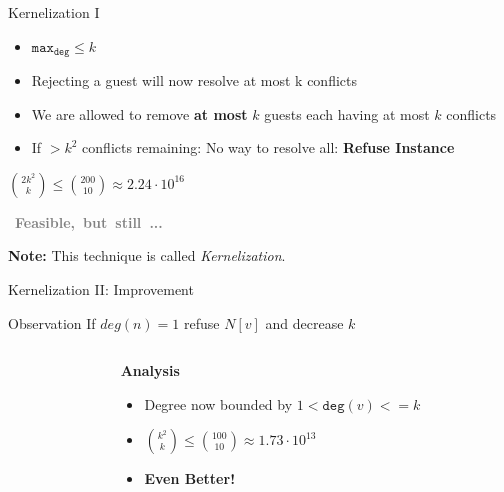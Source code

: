 \begin{frame}[c]{Kernelization I}
\begin{itemize}
    \item $\mathtt{max}_{\mathtt{deg}} \leq k$
    \item Rejecting a guest will now resolve at most k conflicts
    \item We are allowed to remove \textbf{at most} $k$ guests each having at most $k$ conflicts
    \item If $ > k^2$ conflicts remaining: No way to resolve all: \textbf{Refuse Instance}
\end{itemize}
\begin{center}

$\binom{2k^2}{k} \leq \binom{200}{10} \approx 2.24\cdot 10^{16}$


\hbox{
\textcolor{gray}{\textbf{Feasible, but still ...}}
}
\end{center}
   \pause\textbf{Note: }This technique is called \textit{Kernelization}. 
\end{frame}

\begin{frame}[c]{Kernelization II: Improvement}

    \begin{exampleblock}{Observation}
    If $deg(n) = 1$ refuse $N[v]$ and decrease $k$ 
    \end{exampleblock}
    
\begin{columns}[T] %
    \begin{column}{.48\textwidth}
 \begin{center}
    \end{center}
\end{column}%
\begin{column}{.48\textwidth}
\textbf{Analysis}
\begin{itemize}
    \item Degree now bounded by $1 < \mathtt{deg}(v) <= k$
    \item $\binom{k^2}{k} \leq \binom{100}{10} \approx 1.73  \cdot 10^{13}$
    \item \textbf{Even Better!} 
\end{itemize}
\end{column}%
\end{columns}
\end{frame}

